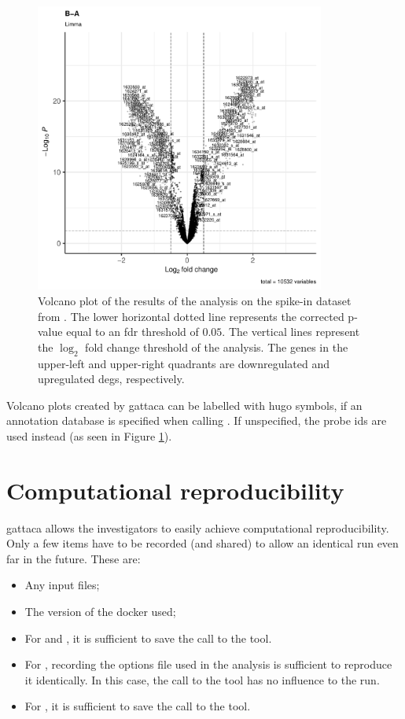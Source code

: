 \begin{figure}
    \centering
    \includegraphics[width=0.85\textwidth]{resources/images/15_Volcano with Limma DEGs B-A.pdf}
    \caption{Volcano plot of the results of the  analysis on the spike-in dataset from \textcite{zhuPreferredAnalysisMethods2010}. The lower horizontal dotted line represents the corrected p-value equal to an \gls{fdr} threshold of $0.05$. The vertical lines represent the $\log_2$ fold change threshold of the analysis. The genes in the upper-left and upper-right quadrants are downregulated and upregulated \glspl{deg}, respectively.}
    \label{fig:volcanolimma}
\end{figure}

Volcano plots created by \gls{gattaca} can be labelled with \gls{hugo} symbols, if an annotation database is specified when calling . If unspecified, the probe ids are used instead (as seen in Figure \ref{fig:volcanolimma}).


\section{Computational reproducibility}
\gls{gattaca} allows the investigators to easily achieve computational reproducibility. Only a few items have to be recorded (and shared) to allow an identical run even far in the future. These are:
\begin{itemize}
    \item Any input files;
    \item The version of the docker used;
    \item For  and , it is sufficient to save the call to the tool.
    \item For , recording the options file used in the analysis is sufficient to reproduce it identically. In this case, the call to the tool has no influence to the run.
    \item For , it is sufficient to save the call to the tool.
\end{itemize}

